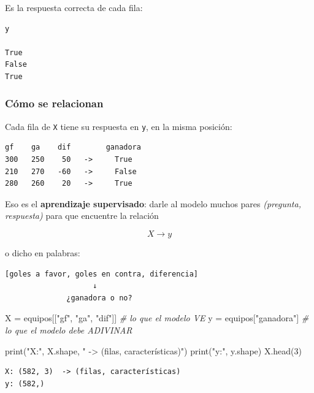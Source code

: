 \documentclass[
]{article}
\newenvironment{Shaded}{}{}
\newcommand{\BuiltInTok}[1]{\textcolor[rgb]{0.00,0.50,0.00}{#1}}
\newcommand{\CommentTok}[1]{\textcolor[rgb]{0.38,0.63,0.69}{\textit{#1}}}
\newcommand{\DecValTok}[1]{\textcolor[rgb]{0.25,0.63,0.44}{#1}}
\newcommand{\NormalTok}[1]{#1}
\newcommand{\OperatorTok}[1]{\textcolor[rgb]{0.40,0.40,0.40}{#1}}
\newcommand{\StringTok}[1]{\textcolor[rgb]{0.25,0.44,0.63}{#1}}
\begin{document}
Es la respuesta correcta de cada fila:

\begin{verbatim}
y

True
False
True
\end{verbatim}

\subsubsection{Cómo se relacionan}\label{cuxf3mo-se-relacionan}

Cada fila de \texttt{X} tiene su respuesta en \texttt{y}, en la misma
posición:

\begin{verbatim}
gf    ga    dif        ganadora
300   250    50   ->     True
210   270   -60   ->     False
280   260    20   ->     True
\end{verbatim}

Eso es el \textbf{aprendizaje supervisado}: darle al modelo muchos pares
\emph{(pregunta, respuesta)} para que encuentre la relación

\[X \longrightarrow y\]

o dicho en palabras:

\begin{verbatim}
[goles a favor, goles en contra, diferencia]
                    ↓
              ¿ganadora o no?
\end{verbatim}

\protect{}\label{e1501fd2}
\begin{Shaded}
\begin{Highlighting}[]
\NormalTok{X }\OperatorTok{=}\NormalTok{ equipos[[}\StringTok{"gf"}\NormalTok{, }\StringTok{"ga"}\NormalTok{, }\StringTok{"dif"}\NormalTok{]]    }\CommentTok{\# lo que el modelo VE}
\NormalTok{y }\OperatorTok{=}\NormalTok{ equipos[}\StringTok{"ganadora"}\NormalTok{]             }\CommentTok{\# lo que el modelo debe ADIVINAR}

\BuiltInTok{print}\NormalTok{(}\StringTok{"X:"}\NormalTok{, X.shape, }\StringTok{" {-}\textgreater{} (filas, características)"}\NormalTok{)}
\BuiltInTok{print}\NormalTok{(}\StringTok{"y:"}\NormalTok{, y.shape)}
\NormalTok{X.head(}\DecValTok{3}\NormalTok{)}
\end{Highlighting}
\end{Shaded}

\begin{verbatim}
X: (582, 3)  -> (filas, características)
y: (582,)
\end{verbatim}
\end{document}

